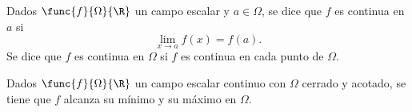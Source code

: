 \documentclass[a4,11pt]{aleph-notas}
\begin{document}
\begin{defi}[Continuidad]
    Dados $\func{f}{\Omega}{\R}$ un campo escalar y $a\in \Omega$, se dice que $f$ es continua en $a$ si
    \[
        \lim_{x\to a}f(x)=f(a).
    \]
    Se dice que $f$ es continua en $\Omega$ si $f$ es continua en cada punto de $\Omega$.
\end{defi}

\begin{prop}
    Dados $\func{f}{\Omega}{\R}$ un campo escalar continuo con $\Omega$ cerrado y acotado, se tiene que $f$ alcanza su mínimo y su máximo en $\Omega$.
\end{prop}
\end{document}
